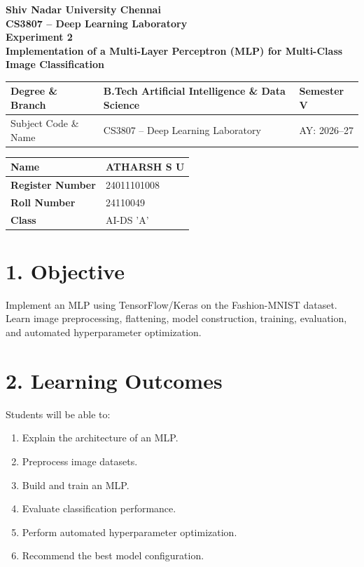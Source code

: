 \documentclass[11pt]{article}
\begin{document}
\begin{center}
{\Large\textbf{Shiv Nadar University Chennai}}\\
\textbf{CS3807 -- Deep Learning Laboratory}\\
\textbf{Experiment 2}\\
{\large\textbf{Implementation of a Multi-Layer Perceptron (MLP) for Multi-Class Image Classification}}
\end{center}

\renewcommand{\arraystretch}{1.25}

\begin{tabular}{|p{3.8cm}|p{8cm}|p{2cm}|}
\hline
Degree \& Branch & B.Tech Artificial Intelligence \& Data Science & Semester V\\ \hline
Subject Code \& Name & CS3807 -- Deep Learning Laboratory & AY: 2026--27\\ \hline
\end{tabular}

\begin{tabular}{|p{3.5cm}|p{8cm}|}
\hline
\textbf{Name} & {ATHARSH S U}\\ \hline
\textbf{Register Number} &{24011101008} \\ \hline
\textbf{Roll Number} &{24110049} \\ \hline
\textbf{Class} & {AI-DS 'A'}\\ \hline
\end{tabular}
\vspace{3mm}


\section*{1. Objective}
Implement an MLP using TensorFlow/Keras on the Fashion-MNIST dataset. Learn image preprocessing, flattening, model construction, training, evaluation, and automated hyperparameter optimization.

\section*{2. Learning Outcomes}
Students will be able to:
\begin{enumerate}
\item Explain the architecture of an MLP.
\item Preprocess image datasets.
\item Build and train an MLP.
\item Evaluate classification performance.
\item Perform automated hyperparameter optimization.
\item Recommend the best model configuration.
\end{enumerate}
\end{document}
